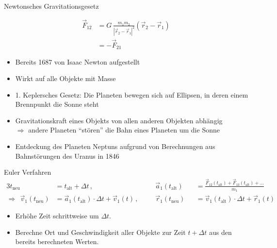 \documentclass[
  a0paper,
  portrait,
  fontscale=.35 %
  ]{baposterrptu}
\newcommand{\myvec}[1]{\vec{#1}}
\newcommand{\alt}{_\text{alt}}
\newcommand{\neu}{_\text{neu}}
\begin{document}
\begin{poster}
  \begin{posterbox}[name=newton, below=intro, column=0]{Newtonsches Gravitationsgesetz}
  \begin{minipage}{.45\textwidth}
    \large
  \begin{align*}
    \myvec{F}_{12} & = G\,\frac{m_1 m_2}{|\myvec{r}_2-\myvec{r}_1|^2}\left(\myvec{r}_2-\myvec{r}_1\right)\\
    &= -\myvec{F}_{21}
  \end{align*}
  \end{minipage}\hfill
  \begin{minipage}{.45\textwidth}
     
  \end{minipage}
  \vspace*{2em}
  \begin{itemize}
    \item Bereits 1687 von Isaac Newton aufgestellt
    \item Wirkt auf alle Objekte mit Masse
    \item 1. Keplersches Gesetz: Die Planeten bewegen sich auf Ellipsen, in deren einem Brennpunkt die Sonne steht
    \item Gravitationskraft eines Objekts von allen anderen Objekten abhängig \\
        $\Rightarrow$ andere Planeten ``stören'' die Bahn eines Planeten um die Sonne
    \item Entdeckung des Planeten Neptuns aufgrund von Berechnungen aus Bahnstörungen des Uranus in 1846
  \end{itemize}
  \end{posterbox}

  \begin{posterbox}[below=newton, column=0]{Euler Verfahren}
    \vspace{-.5cm}
    \begin{alignat*}{3}
      t\neu &= t\alt + \Delta t\,, && \myvec{a}_1(t\alt) &&= \frac{\myvec{F}_{12}(t\alt) + \myvec{F}_{13}(t\alt) + \dots}{m_1}\\
      \Rightarrow~~
      \myvec{v}_1(t\neu) &= \myvec{a}_1(t\alt) \cdot \Delta t + \myvec{v}_1(t)\,, ~~~~
      &&\myvec{r}_1(t\neu) &&= \myvec{v}_1(t\alt) \cdot \Delta t + \myvec{r}_1(t)
    \end{alignat*} 
    \begin{itemize}
      \item Erhöhe Zeit schrittweise um $\Delta t$.
      \item Berechne Ort und Geschwindigkeit aller Objekte zur Zeit $t + \Delta t$ aus den bereits berechneten Werten.
    \end{itemize}
  \end{posterbox}


\end{poster}
\end{document}
